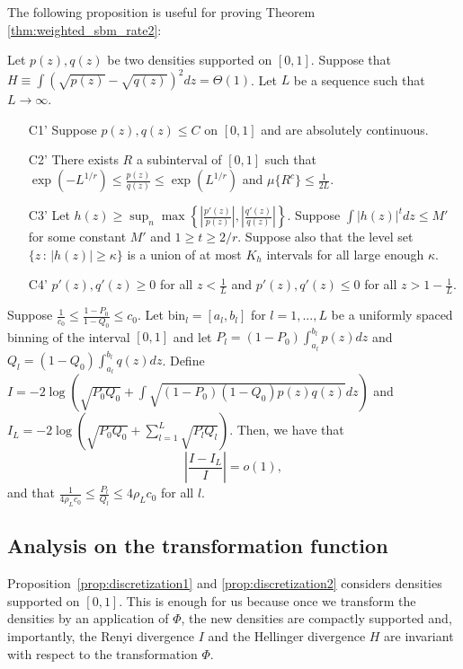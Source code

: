 \documentclass{article}
\newcommand{\bin}{\text{bin}}
\begin{document}
\noindent The following proposition is useful for proving Theorem \ref{thm:weighted_sbm_rate2}:

\begin{proposition}
\label{prop:discretization2}
Let $p(z), q(z)$ be two densities supported on $[0,1]$. Suppose that $H \equiv \int (\sqrt{p(z)} - \sqrt{q(z)})^2 dz = \Theta(1)$. Let $L$ be a sequence such that $L \rightarrow \infty$.
\begin{enumerate}
\item[C1'] Suppose $p(z), q(z) \leq C$ on $[0,1]$ and are absolutely continuous.
\item[C2'] There exists $R$ a subinterval of $[0,1]$ such that $\exp(-L^{1/r}) \leq \frac{p(z)}{q(z)} \leq \exp(L^{1/r})$ and $\mu\{ R^c \} \leq \frac{1}{2L}$.
\item[C3'] Let $h(z) \geq \sup_n \max \left\{  \left|\frac{p'(z)}{p(z)} \right|, 
 \left|\frac{q'(z)}{q(z)}\right|  \right\} $. Suppose $\int |h(z)|^t dz \leq M'$ for some constant $M'$ and $1 \geq t \geq 2/r$. Suppose also that the level set $\{z \,:\, |h(z)| \geq \kappa\}$ is a union of at most $K_h$ intervals for all large enough $\kappa$.  
\item[C4']  $p'(z), q'(z) \geq 0$ for all $z < \frac{1}{L}$ and $p'(z), q'(z) \leq 0$ for all $z > 1-\frac{1}{L}$. 
\end{enumerate}
Suppose $\frac{1}{c_0} \leq \frac{1 - P_0}{1-Q_0} \leq c_0$. Let $\bin_l = [a_l, b_l]$ for $l=1,...,L$ be a uniformly spaced binning of the interval $[0,1]$ and let $P_l = (1- P_0) \int_{a_l}^{b_l} p(z) dz$ and $Q_l = (1-Q_0)\int_{a_l}^{b_l} q(z) dz$. Define $I = -2 \log \left( \sqrt{P_0 Q_0} + \int \sqrt{(1-P_0)(1-Q_0) p(z) q(z)} dz \right)$ and $I_L = -2 \log \left( \sqrt{P_0 Q_0} + \sum_{l=1}^L \sqrt{P_l Q_l} \right)$. Then, we have that
 $$\left| \frac{I - I_L}{I} \right| = o(1),$$ 
and that $\frac{1}{4\rho_L c_0} \leq \frac{P_l}{Q_l} \leq 4\rho_L c_0$ for all $l$. 
\end{proposition}


\subsection{Analysis on the transformation function}
\label{sec:transformation_analysis}

Proposition~\ref{prop:discretization1} and \ref{prop:discretization2} considers densities supported on $[0,1]$. This is enough for us because once we transform the densities by an application of $\Phi$, the new densities are compactly supported and, importantly, the Renyi divergence $I$ and the Hellinger divergence $H$ are invariant with respect to the transformation $\Phi$.
\end{document}
